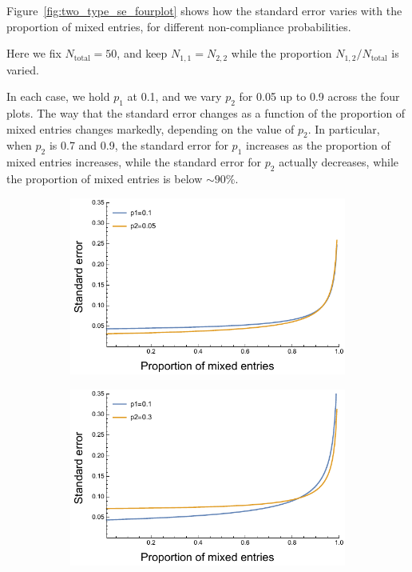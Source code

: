 \documentclass[useAMS,usenatbib,referee]{biom}
\newif\ifproofread
\newcommand{\rev}[1]{%
\ifproofread
\hl{#1}%
\else
#1%
\fi
}
\begin{document}
Figure~\ref{fig:two_type_se_fourplot} shows how the standard error varies with the proportion of mixed entries, for different non-compliance probabilities. \rev{Here we fix $N_\text{total}=50$, and keep $N_{1,1}=N_{2,2}$ while the proportion $N_{1,2}/N_\text{total}$ is varied.} In each case, we hold \(p_1\) at 0.1, and we vary \(p_2\) for 0.05 up to 0.9 across the four plots. The way that the standard error changes as a function of the proportion of mixed entries changes markedly, depending on the value of \(p_2\). In particular, when \(p_2\) is 0.7 and 0.9, the standard error for \(p_1\) increases as the proportion of mixed entries increases, while the standard error for \(p_2\) actually decreases, while the proportion of mixed entries is below \(\sim 90 \%\).



\begin{figure}[h]
\begin{subfigure}[b]{.49\textwidth}
\includegraphics[width=\textwidth]{SE_twotype_p1_01_p2_005.pdf}
\end{subfigure}
\hfill
\begin{subfigure}[b]{0.49\textwidth}
\includegraphics[width=\textwidth]{SE_twotype_p1_01_p2_03.pdf}

\end{subfigure}
\end{figure}
\end{document}
